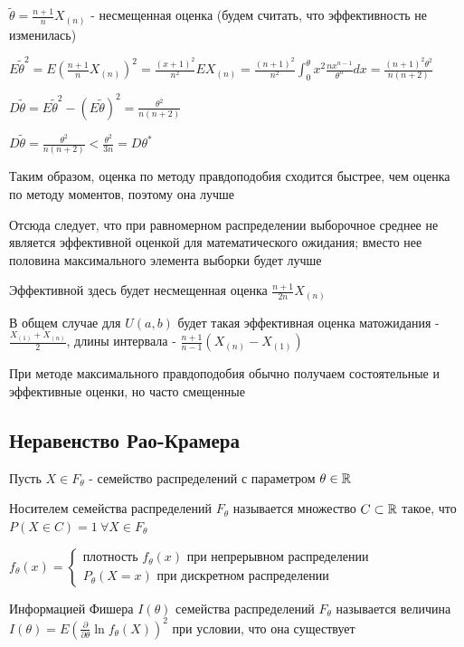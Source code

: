 \documentclass[12pt]{article}
\begin{document}
$\tilde{\theta} = \frac{n + 1}{n} X_{(n)}$ - несмещенная оценка (будем считать, что эффективность не изменилась)

$E\tilde{\theta}^2 = E(\frac{n + 1}{n} X_{(n)})^2 = \frac{(x + 1)^2}{n^2} E X_{(n)} = \frac{(n + 1)^2}{n^2} \int_0^\theta x^2 \frac{n x^{n - 1}}{\theta^n} dx = 
\frac{(n + 1)^2 \theta^2}{n (n + 2)}$

$D\tilde{\theta} = E\tilde{\theta}^2 - (E\tilde{\theta})^2 = \frac{\theta^2}{n(n + 2)}$

$D\tilde{\theta} = \frac{\theta^2}{n(n + 2)} < \frac{\theta^2}{3n} = D\theta^*$

Таким образом, оценка по методу правдоподобия сходится быстрее, чем оценка по методу моментов, поэтому она лучше

Отсюда следует, что при равномерном распределении выборочное среднее не является эффективной оценкой
для математического ожидания; вместо нее половина максимального элемента выборки будет лучше

\Nota Эффективной здесь будет несмещенная оценка $\frac{n + 1}{2n} X_{(n)}$

В общем случае для $U(a, b)$ будет такая эффективная оценка матожидания - $\frac{X_{(1)} + X_{(n)}}{2}$, длины интервала - $\frac{n + 1}{n - 1} (X_{(n)} - X_{(1)})$

\Nota При методе максимального правдоподобия обычно получаем состоятельные и эффективные оценки, но часто смещенные

\subsection{Неравенство Рао-Крамера}

Пусть $X \in F_\theta$ - семейство распределений с параметром $\theta \in \mathbb{R}$

\Def Носителем семейства распределений $F_\theta$ называется множество $C \subset \mathbb{R}$
такое, что $P(X \in C) = 1 \ \forall X \in F_\theta$

$f_\theta(x) = \begin{cases}
    \text{плотность } f_\theta(x) \text{ при непрерывном распределении} \\
    P_\theta(X = x) \text{ при дискретном распределении}
\end{cases}$

\Def Информацией Фишера $I(\theta)$ семейства распределений $F_\theta$ называется величина 
$I(\theta) = E\left(\frac{\partial}{\partial \theta} \ln f_\theta(X)\right)^2$ при условии, что
она существует
\end{document}
